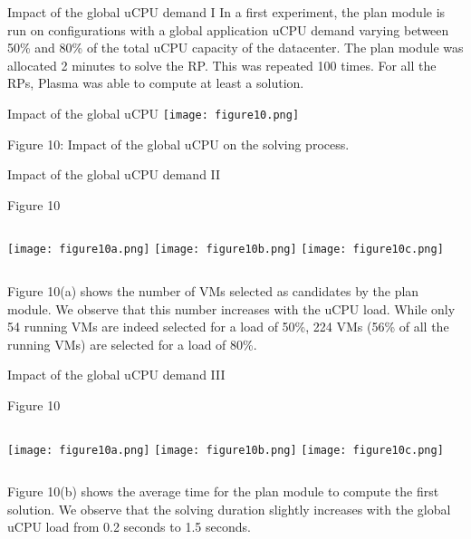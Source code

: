 \begin{frame}{ Impact of the global uCPU demand I}
In a first experiment, the plan module is run on configurations with a global 
application uCPU demand varying
between 50\% and 80\% of the total uCPU capacity of the datacenter. The plan
module was allocated 2 minutes to solve the RP. This was repeated 100 times.
For all the RPs, Plasma was able to compute at least a solution.
 \pause{}
\begin{block}{Impact of the global uCPU }
\texttt{[image: figure10.png]} 

Figure 10: Impact of the global uCPU on the solving process.
\end{block}
\end{frame}
\begin{frame}[shrink=6]{ Impact of the global uCPU demand II}

\begin{block}{Figure 10}
\begin{center}
\begin{columns}[t]
\texttt{[image: figure10a.png]}
\texttt{[image: figure10b.png]}  
\texttt{[image: figure10c.png]} 
\end{columns}
\end{center}
\end{block}

Figure 10(a) shows the number of VMs selected as candidates by the plan
module. We observe that this number increases with the uCPU load. While
only 54 running VMs are indeed selected for a load of 50\%, 224 VMs (56\% of all
the running VMs) are selected for a load of 80\%. 
\end{frame}
\begin{frame}{ Impact of the global uCPU demand III}

\begin{block}{Figure 10}
\begin{center}
\begin{columns}[t]
\texttt{[image: figure10a.png]}
\texttt{[image: figure10b.png]}  
\texttt{[image: figure10c.png]} 
\end{columns}
\end{center}
\end{block}

Figure 10(b) shows the average
time for the plan module to compute the first solution. We observe that the
solving duration slightly increases with the global uCPU load from 0.2 seconds
to 1.5 seconds. 
\end{frame}
